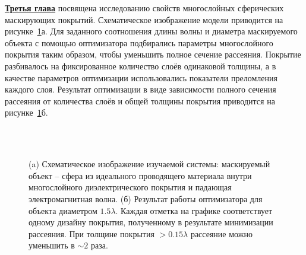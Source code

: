 \underline{\textbf{Третья глава}} посвящена исследованию свойств
многослойных сферических маскирующих покрытий. Схематическое
изображение модели приводится на рисунке~\ref{img:scattering}а. Для
заданного соотношения длины волны и диаметра маскируемого объекта с
помощью оптимизатора подбирались параметры многослойного покрытия
таким образом, чтобы уменьшить полное сечение рассеяния.  Покрытие
разбивалось на фиксированное количество слоёв одинаковой толщины, а в
качестве параметров оптимизации использовались показатели преломления
каждого слоя.  Результат оптимизации в виде зависимости полного
сечения рассеяния от количества слоёв и общей толщины покрытия
приводится на рисунке~\ref{img:scattering}б.
\begin{figure}[t]
  \begin{minipage}[ht]{0.45\linewidth}        
  \end{minipage}
  \hfill
  \begin{minipage}[ht]{0.54\linewidth}
  \end{minipage}\\
  \vspace{0.3em}\\
  \begin{minipage}[ht]{0.45\linewidth}        
  \end{minipage}
  \hfill
  \begin{minipage}[ht]{0.54\linewidth}
  \end{minipage}
  \caption{(a) Схематическое изображение изучаемой системы: маскируемый
    объект -- сфера из идеального проводящего материала внутри
    многослойного диэлектрического покрытия и падающая
    электромагнитная волна. (б) 
    Результат работы оптимизатора для объекта диаметром $1.5\lambda$.
    Каждая отметка на графике соответствует одному дизайну покрытия,
    полученному в результате минимизации рассеяния. При толщине
    покрытия $>0.15\lambda$ рассеяние можно уменьшить в $\sim 2$
    раза.}
  \label{img:scattering}  
\end{figure}
